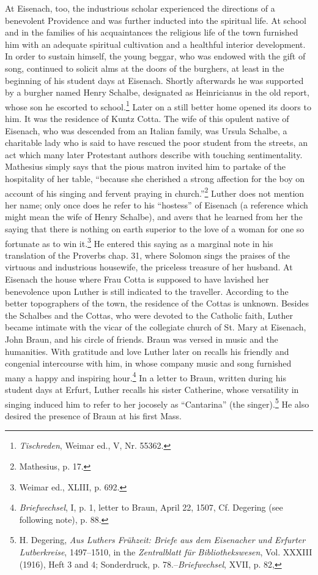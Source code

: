 At Eisenach, too, the industrious scholar experienced the directions
of a benevolent Providence and was further inducted into the spiritual life. At school and in the families of his acquaintances the religious
life of the town furnished him with an adequate spiritual cultivation
and a healthful interior development. In order to sustain himself, the
young beggar, who was endowed with the gift of song, continued to
solicit alms at the doors of the burghers, at least in the beginning of
his student days at Eisenach. Shortly afterwards he was supported by
a burgher named Henry Schalbe, designated as Heinricianus in the
old report, whose son he escorted to school.\footnote{\textit{Tischreden}, Weimar ed., V, Nr. 55362.}
Later on a still better
home opened its doors to him. It was the residence of Kuntz Cotta.
The wife of this opulent native of Eisenach, who was descended from
an Italian family, was Ursula Schalbe, a charitable lady who is said
to have rescued the poor student from the streets, an act which many
later Protestant authors describe with touching sentimentality. Mathesius simply says that the pious matron invited him to partake of the
hospitality of her table, “because she cherished a strong affection for
the boy on account of his singing and fervent praying in church.”\footnote
{Mathesius, p. 17.}
Luther does not mention her name; only once does he refer to his
“hostess” of Eisenach (a reference which might mean the wife of
Henry Schalbe), and avers that he learned from her the saying that
there is nothing on earth superior to the love of a woman for one so
fortunate as to win it.\footnote{Weimar ed., XLIII, p. 692.}
He entered this saying as a marginal note in
his translation of the Proverbs chap. 31, where Solomon sings the
praises of the virtuous and industrious housewife, the priceless treasure of her husband.
At Eisenach the house where Frau Cotta is supposed
to have lavished her benevolence upon Luther is still indicated
to the traveller. According to the better topographers of the town, the
residence of the Cottas is unknown.
Besides the Schalbes and the Cottas, who were devoted to the
Catholic faith, Luther became intimate with the vicar of the collegiate
church of St. Mary at Eisenach, John Braun, and his circle of friends.
Braun was versed in music and the humanities. With gratitude and
love Luther later on recalls his friendly and congenial intercourse with
him, in whose company music and song furnished many a happy and
inspiring hour.\footnote{\textit{Briefwechsel}, I, p. 1, letter to Braun, April 22, 1507, Cf. Degering (see following note), p. 88.}
In a letter to Braun, written during his student
days at Erfurt, Luther recalls his sister Catherine, whose versatility
in singing induced him to refer to her jocosely as “Cantarina”
(the singer).\footnote{H. Degering, \textit{Aus Luthers Frühzeit: Briefe aus dem Eisenacher und Erfurter Lutberkreise}, 1497--1510, in the \textit{Zentralblatt für Bibliothekswesen}, Vol. XXXIII (1916), Heft 3 and 4; Sonderdruck, p. 78.--\textit{Briefwechsel}, XVII, p. 82,}
He also desired the presence of Braun at his first Mass.

